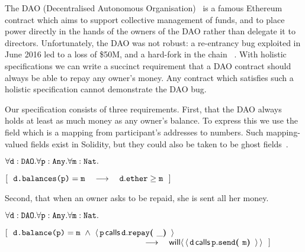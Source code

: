 The DAO  {(Decentralised Autonomous Organisation)}~\cite{Dao}  is a famous Ethereum contract  which aims to support
collective management of funds,  and to place power directly in the
hands of the owners of the DAO
rather than delegate it to directors.
Unfortunately, the DAO was not robust:
a re-entrancy bug   exploited in June 2016 led  to a loss of   \$50M, and
a hard-fork in the  chain ~\cite{DaoBug}.
%
With holistic specifications  we can  write a succinct requirement that a
DAO contract should always be able to repay any owner's money.
Any contract which satisfies such a holistic specification cannot demonstrate the DAO bug.
 
Our specification consists of three requirements.
First, that the DAO always holds at least as 
much money as any owner's balance.
To express this we use 
the field  which is a mapping from participant's addresses to 
numbers. Such mapping-valued fields exist in Solidity, but they could
also be taken to be ghost fields~\cite{ghost}.
  
\vspace{.1cm}

\noindent
 \strut \hspace{0.5cm} $\forall \prg{d}:\prg{DAO}.\forall \prg{p}:\prg{Any}.\forall\prg{m}:\prg{Nat}.$\\
\strut \hspace{0.5cm} $[\ \ \prg{d.balances(p)}=\prg{m}  \ \ \  \longrightarrow  \ \ \ \prg{d}.\prg{ether}\geq \prg{m} \ \ ] $


\noindent
Second, that when an owner asks to be repaid, she is sent all her money.
\vspace{.1cm}

\noindent
 \strut \hspace{0.5cm} $\forall \prg{d}:\prg{DAO}.\forall \prg{p}:\prg{Any}.\forall\prg{m}:\prg{Nat}.$\\
\strut \hspace{0.5cm} $[\ \ \prg{d.balance(p)}=\prg{m}
 \ \wedge \ \Calls{\prg{p}}{\prg{repay}}{\prg{d}}{\_}  $\\
 $\strut \hspace{5.5cm}   \ \ \  \longrightarrow  \ \ \  \Future{\Calls{\prg{d}}{\prg{send}}{\prg{p}}{\prg{m}}}\ \ ] $  
\vspace{.1cm}

 

